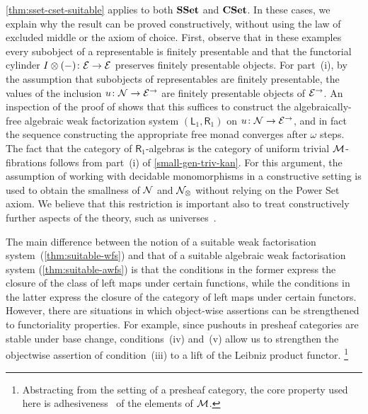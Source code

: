 \documentclass[reqno,10pt,a4paper,oneside,draft]{amsart}
\begin{document}
{{\begin{remark} \label{rem:constructive-small-object}
\cref{thm:sset-cset-suitable} applies to both $\SSet$ and $\CSet$.
In these cases, we explain why the result can be proved constructively, \ie without using the law of excluded middle or the axiom of choice.
First, observe that in these examples every subobject of a representable is finitely presentable and that the functorial cylinder $\interval \otimes (-) \co \cal{E} \to \cal{E}$ preserves finitely presentable objects.
For part~(i), by the assumption that subobjects of representables are finitely presentable, the values of the inclusion $u \co \cal{N} \to \cal{E}^\to$ are finitely presentable objects of $\cal{E}^\to$.
An inspection of the proof of \cite[Theorem~4.4]{garner:small-object-argument} shows that this suffices to construct the algebraically-free algebraic weak factorization system $(\mathsf{L}_1, \mathsf{R}_1)$ on $u \co \cal{N} \to \cal{E}^\to$, and in fact the sequence constructing the appropriate free monad converges after $\omega$ steps.
The fact that the category of $\mathsf{R}_1$-algebras is the category of uniform trivial $\cal{M}$-fibrations follows from part~(i) of \cref{small-gen-triv-kan}. For this argument, the assumption of working with decidable monomorphisms in a constructive setting is used to obtain the smallness of $\cal{N}$ and $\cal{N}_\otimes$ without relying on the Power Set axiom.
We believe that this restriction is important also to treat constructively further aspects of the theory, such as universes~\cite{cohen-et-al:cubicaltt}.
\end{remark} 


\begin{remark}  \label{rem-lift-suitable} 
The main difference between the notion of a suitable weak factorisation system~(\cref{thm:suitable-wfs}) and that of a suitable algebraic
weak factorisation system (\cref{thm:suitable-awfs}) is that the conditions in the former express the closure of the class of left maps under certain functions, while the conditions in the latter express the closure of the category of left maps under certain functors. However,
there are situations in which object-wise assertions can be strengthened to functoriality properties. For example, 
since pushouts in presheaf categories are stable under base change, conditions~(iv) and~(v) allow us to strengthen the objectwise assertion of condition~(iii) to a lift of the Leibniz product functor.%
\footnote{Abstracting from the setting of a presheaf category, the core property used here is adhesiveness~\cite{garner-lack:adhesive} of the elements of $\cal{M}$.}
\end{remark}


}}
\end{document}
